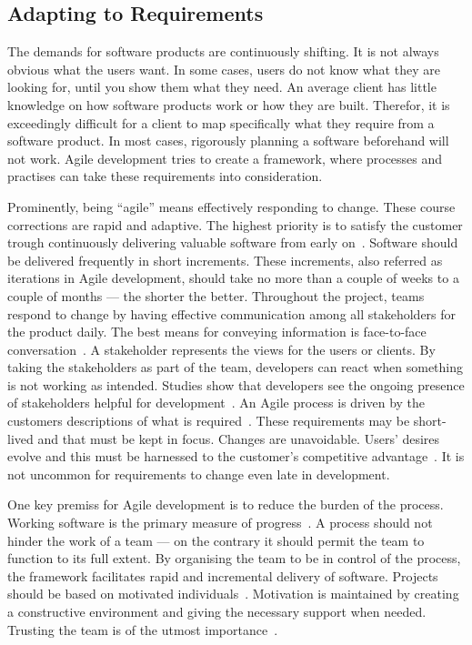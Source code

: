 \documentclass[english]{tktltiki2}
\begin{document}
\subsection{Adapting to Requirements}

The demands for software products are continuously shifting. It is not always obvious what the users want. In some cases, users do not know what they are looking for, until you show them what they need. An average client has little knowledge on how software products work or how they are built. Therefor, it is exceedingly difficult for a client to map specifically what they require from a software product. In most cases, rigorously planning a software beforehand will not work. Agile development tries to create a framework, where processes and practises can take these requirements into consideration.

Prominently, being “agile” means effectively responding to change. These course corrections are rapid and adaptive. The highest priority is to satisfy the customer trough continuously delivering valuable software from early on~\cite{BBB01b}. Software should be delivered frequently in short increments. These increments, also referred as iterations in Agile development, should take no more than a couple of weeks to a couple of months — the shorter the better. Throughout the project, teams respond to change by having effective communication among all stakeholders for the product daily. The best means for conveying information is face-to-face conversation~\cite{BBB01b}. A stakeholder represents the views for the users or clients. By taking the stakeholders as part of the team, developers can react when something is not working as intended. Studies show that developers see the ongoing presence of stakeholders helpful for development~\cite{DD08}. An Agile process is driven by the customers descriptions of what is required~\cite{BBB01b}. These requirements may be short-lived and that must be kept in focus. Changes are unavoidable. Users’ desires evolve and this must be harnessed to the customer’s competitive advantage~\cite{BBB01b}. It is not uncommon for requirements to change even late in development.

One key premiss for Agile development is to reduce the burden of the process. Working software is the primary measure of progress~\cite{BBB01b}. A process should not hinder the work of a team — on the contrary it should permit the team to function to its full extent. By organising the team to be in control of the process, the framework facilitates rapid and incremental delivery of software. Projects should be based on motivated individuals~\cite{BBB01b}. Motivation is maintained by creating a constructive environment and giving the necessary support when needed. Trusting the team is of the utmost importance~\cite{BBB01b}.
\end{document}
